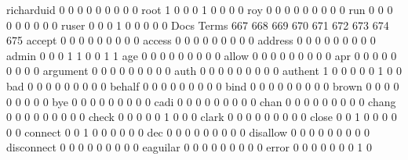\documentclass[compress,8pt]{beamer}
\begin{document}
\begin{frame}
\begin{Schunk}
  richarduid                                 0   0   0   0   0   0   0   0   0
  root                                       1   0   0   0   1   0   0   0   0
  roy                                        0   0   0   0   0   0   0   0   0
  run                                        0   0   0   0   0   0   0   0   0
  ruser                                      0   0   0   1   0   0   0   0   0
                                          Docs
Terms                                      667 668 669 670 671 672 673 674 675
  accept                                     0   0   0   0   0   0   0   0   0
  access                                     0   0   0   0   0   0   0   0   0
  address                                    0   0   0   0   0   0   0   0   0
  admin                                      0   0   0   1   1   0   0   1   1
  age                                        0   0   0   0   0   0   0   0   0
  allow                                      0   0   0   0   0   0   0   0   0
  apr                                        0   0   0   0   0   0   0   0   0
  argument                                   0   0   0   0   0   0   0   0   0
  auth                                       0   0   0   0   0   0   0   0   0
  authent                                    1   0   0   0   0   0   1   0   0
  bad                                        0   0   0   0   0   0   0   0   0
  behalf                                     0   0   0   0   0   0   0   0   0
  bind                                       0   0   0   0   0   0   0   0   0
  brown                                      0   0   0   0   0   0   0   0   0
  bye                                        0   0   0   0   0   0   0   0   0
  cadi                                       0   0   0   0   0   0   0   0   0
  chan                                       0   0   0   0   0   0   0   0   0
  chang                                      0   0   0   0   0   0   0   0   0
  check                                      0   0   0   0   0   1   0   0   0
  clark                                      0   0   0   0   0   0   0   0   0
  close                                      0   0   1   0   0   0   0   0   0
  connect                                    0   0   1   0   0   0   0   0   0
  dec                                        0   0   0   0   0   0   0   0   0
  disallow                                   0   0   0   0   0   0   0   0   0
  disconnect                                 0   0   0   0   0   0   0   0   0
  eaguilar                                   0   0   0   0   0   0   0   0   0
  error                                      0   0   0   0   0   0   0   1   0

\end{Schunk}
\end{frame}
\end{document}
